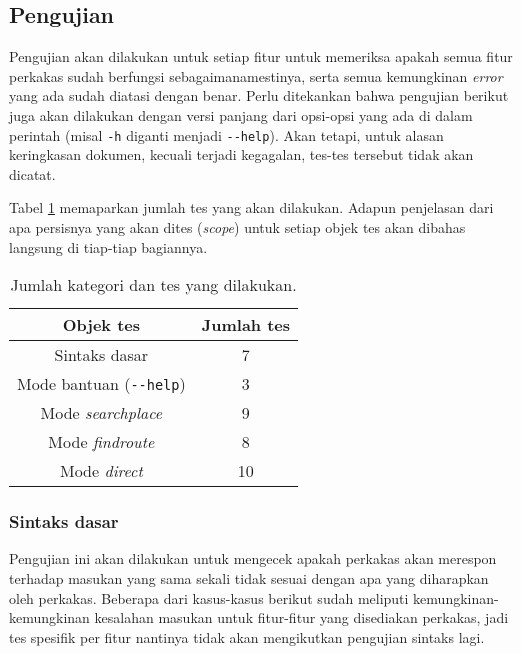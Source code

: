\subsection{Pengujian}
\label{sec:testing-experiments-testing}

Pengujian akan dilakukan untuk setiap fitur untuk memeriksa apakah semua fitur perkakas sudah berfungsi sebagaimanamestinya, serta semua kemungkinan \textit{error} yang ada sudah diatasi dengan benar. Perlu ditekankan bahwa pengujian berikut juga akan dilakukan dengan versi panjang dari opsi-opsi yang ada di dalam perintah (misal \verb|-h| diganti menjadi \verb|--help|). Akan tetapi, untuk alasan keringkasan dokumen, kecuali terjadi kegagalan, tes-tes tersebut tidak akan dicatat.

Tabel \ref{tab:testing-experiments-testing-overview} memaparkan jumlah tes yang akan dilakukan. Adapun penjelasan dari apa persisnya yang akan dites (\textit{scope}) untuk setiap objek tes akan dibahas langsung di tiap-tiap bagiannya.

\begin{table}[H]
    \centering
    \begin{tabular}{| c | c |}
    \hline
        \textbf{Objek tes} & \textbf{Jumlah tes} \\
    \hline
    \hline
        Sintaks dasar & 7 \\
    \hline
        Mode bantuan (\verb|--help|) & 3 \\
    \hline
        Mode \textit{searchplace} & 9 \\
    \hline
        Mode \textit{findroute} & 8 \\
    \hline
        Mode \textit{direct} & 10 \\
    \hline
	\end{tabular}
    \caption{Jumlah kategori dan tes yang dilakukan.}
    \label{tab:testing-experiments-testing-overview}
\end{table}

\subsubsection{Sintaks dasar}
\label{sec:testing-experiments-testing-basic}

Pengujian ini akan dilakukan untuk mengecek apakah perkakas akan merespon terhadap masukan yang sama sekali tidak sesuai dengan apa yang diharapkan oleh perkakas. Beberapa dari kasus-kasus berikut sudah meliputi kemungkinan-kemungkinan kesalahan masukan untuk fitur-fitur yang disediakan perkakas, jadi tes spesifik per fitur nantinya tidak akan mengikutkan pengujian sintaks lagi.

